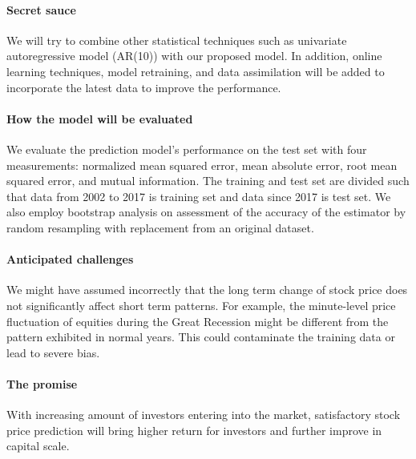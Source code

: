 \documentclass{article}
\begin{document}
\paragraph{Secret sauce}
We will try to combine other statistical techniques such as univariate autoregressive model (AR(10)) with our proposed model. In addition, online learning techniques, model retraining, and data assimilation will be added to incorporate the latest data to improve the performance.

\paragraph{How the model will be evaluated}
We evaluate the prediction model's performance on the test set with four measurements: normalized mean squared error, mean absolute error, root mean squared error, and mutual information. The training and test set are divided such that data from 2002 to 2017 is training set and data since 2017 is test set. We also employ bootstrap analysis on assessment of the accuracy of the estimator by random resampling with replacement from an original dataset.

\paragraph{Anticipated challenges}
We might have assumed incorrectly that the long term change of stock price does not significantly affect short term patterns. For example, the minute-level price fluctuation of equities during the Great Recession might be different from the pattern exhibited in normal years. This could contaminate the training data or lead to severe bias.

\paragraph{The promise}
With increasing amount of investors entering into the market, satisfactory stock price prediction will bring higher return for investors and further improve in capital scale.

\newpage


\end{document}
